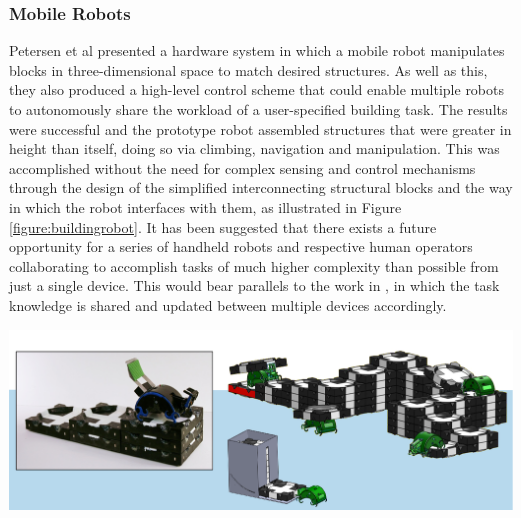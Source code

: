 \documentclass[11pt]{article}
\begin{document}
\subsubsection{Mobile Robots} \label{mobilerobots}
Petersen et al \cite{Petersen2011} presented a hardware system in which a mobile robot manipulates blocks in three-dimensional space to match desired structures. As well as this, they also produced a high-level control scheme that could enable multiple robots to autonomously share the workload of a user-specified building task. The results were successful and the prototype robot assembled structures that were greater in height than itself, doing so via climbing, navigation and manipulation. This was accomplished without the need for complex sensing and control mechanisms through the design of the simplified interconnecting structural blocks and the way in which the robot interfaces with them, as illustrated in Figure \ref{figure:buildingrobot}. It has been suggested that there exists a future opportunity for a series of handheld robots and respective human operators collaborating to accomplish tasks of much higher complexity than possible from just a single device. This would bear parallels to the work in \cite{Petersen2011}, in which the task knowledge is shared and updated between multiple devices accordingly.

\begin{center}
\includegraphics[width = \textwidth]{buildingrobot.png}
\label{figure:buildingrobot}
\end{center}
\end{document}
